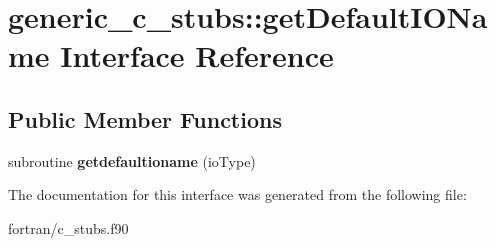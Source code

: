 \hypertarget{interfacegeneric__c__stubs_1_1get_default_i_o_name}{}\section{generic\+\_\+c\+\_\+stubs\+:\+:get\+Default\+I\+O\+Name Interface Reference}
\label{interfacegeneric__c__stubs_1_1get_default_i_o_name}
\subsection*{Public Member Functions}
\begin{DoxyCompactItemize}
\item 
\mbox{\label{interfacegeneric__c__stubs_1_1get_default_i_o_name_a4bd510de5876b2a27565e104870a331c}} 
subroutine {\bfseries getdefaultioname} (io\+Type)
\end{DoxyCompactItemize}


The documentation for this interface was generated from the following file\+:\begin{DoxyCompactItemize}
\item 
fortran/c\+\_\+stubs.\+f90\end{DoxyCompactItemize}

